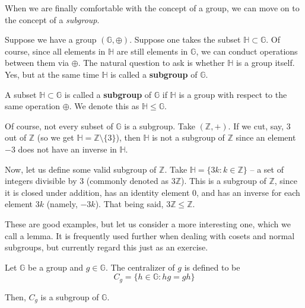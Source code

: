 \documentclass[../lecture-notes.tex]{subfiles}
\begin{document}
When we are finally comfortable with the concept of a group, we can move on to the concept of a \textit{subgroup}. 

Suppose we have a group $(\mathbb{G},\oplus)$. Suppose one takes the subset $\mathbb{H} \subset \mathbb{G}$. Of course, since all elements in $\mathbb{H}$ are still elements in $\mathbb{G}$, we can conduct operations between them via $\oplus$. 
The natural question to ask is whether $\mathbb{H}$ is a group itself. Yes, but at the same time $\mathbb{H}$ is called a \textbf{subgroup} of $\mathbb{G}$.

\begin{definition}
    A subset $\mathbb{H} \subset \mathbb{G}$ is called a \textbf{subgroup} of $\mathbb{G}$ if $\mathbb{H}$ is a group with respect to the same operation $\oplus$. We denote this as $\mathbb{H} \leq \mathbb{G}$.
\end{definition}

\begin{example}
    Of course, not every subset of $\mathbb{G}$ is a subgroup. Take $(\mathbb{Z}, +)$. If we cut, say, $3$ out of $\mathbb{Z}$ (so we get $\mathbb{H} = \mathbb{Z} \setminus \{3\}$), then $\mathbb{H}$ is not a subgroup of $\mathbb{Z}$ since an element $-3$ does not have an inverse in $\mathbb{H}$.
\end{example}

\begin{example}
    Now, let us define some valid subgroup of $\mathbb{Z}$. Take $\mathbb{H} = \{3k: k \in \mathbb{Z}\}$ -- a set of integers divisible by $3$ (commonly denoted as $3\mathbb{Z}$). This is a subgroup of $\mathbb{Z}$, since it is closed under addition, has an identity element $0$, and has an inverse for each element $3k$ (namely, $-3k$). That being said, $3\mathbb{Z} \leq \mathbb{Z}$.
\end{example}

These are good examples, but let us consider a more interesting one, which we call a lemma. It is frequently used further when dealing with cosets and normal subgroups, but currently regard this just as an exercise.
\begin{lemma}
    Let $\mathbb{G}$ be a group and $g \in \mathbb{G}$. The centralizer of $g$ is defined to be
    \begin{equation}
        C_g = \{h \in \mathbb{G}: h g = g h\}
    \end{equation}

    Then, $C_g$ is a subgroup of $\mathbb{G}$.
\end{lemma}
\end{document}

